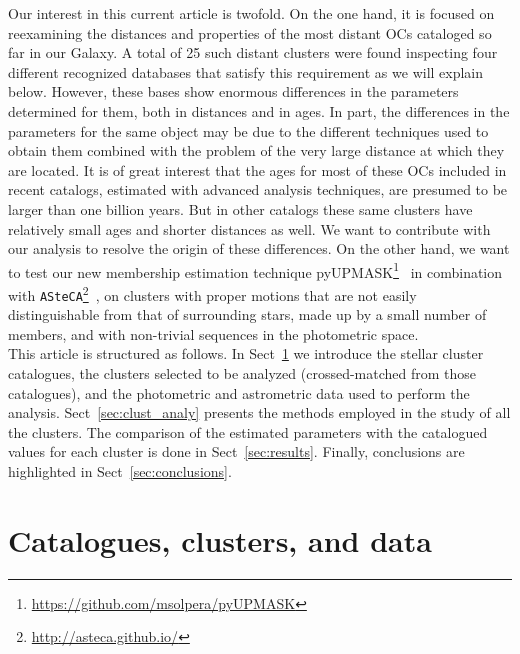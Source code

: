 \documentclass[draft]{aa}
\begin{document}
 Our interest in this current article is twofold. On the one hand, it is focused
 on reexamining the distances and properties of the most distant OCs cataloged
 so far in our Galaxy. A total of 25 such distant clusters were found
 inspecting four different recognized databases that satisfy this requirement as
 we will explain below. However, these bases show enormous differences in the
 parameters determined for them, both in distances and in ages. In part, the
 differences in the parameters for the same object may be
 due to the different techniques used to obtain them combined with the problem
 of the very large distance at which they are located.
 It is of great interest that the ages for most of these OCs included in recent
 catalogs, estimated with advanced analysis techniques, are presumed to be
 larger than one billion years. But in other catalogs these same clusters have
 relatively small ages and shorter distances as well. We want to
 contribute with our analysis to resolve the origin of these differences.
 On the other hand, we want to test our new membership estimation technique
 pyUPMASK\footnote{\url{https://github.com/msolpera/pyUPMASK}}~\citep{Pera_2021}
 in combination with
 \texttt{ASteCA}\footnote{\url{http://asteca.github.io/}}~\citep{Perren_2015},
 on clusters with proper motions that are
 not easily distinguishable from that of surrounding stars, made up by a small
 number of members, and with non-trivial sequences in the photometric space.\\


 This article is structured as follows. In Sect~\ref{sec:cat_clust_data} we
 introduce the stellar cluster catalogues, the clusters selected to be
 analyzed (crossed-matched from those catalogues), and the photometric and
 astrometric data used to perform the analysis.
 Sect~\ref{sec:clust_analy} presents the methods employed in the study of all the
 clusters. The comparison of the estimated parameters with the catalogued
 values for each cluster is done in Sect~\ref{sec:results}. Finally,
 conclusions are highlighted in Sect~\ref{sec:conclusions}.





\section{Catalogues, clusters, and data}
 \label{sec:cat_clust_data}
\end{document}
